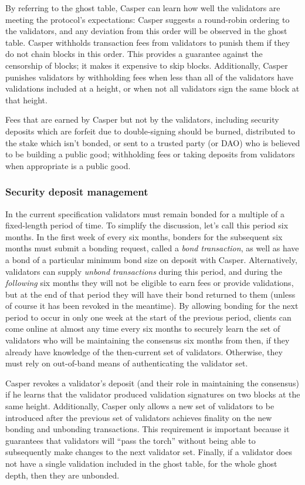 \documentclass[11pt,a4paper]{article}
\begin{document}
By referring to the ghost table, Casper can learn how well the validators are meeting the protocol's expectations: Casper suggests a round-robin ordering to the validators, and any deviation from this order will be observed in the ghost table. Casper withholds transaction fees from validators to punish them if they do not chain blocks in this order. This provides a guarantee against the censorship of blocks; it makes it expensive to skip blocks. Additionally, Casper punishes validators by withholding fees when less than all of the validators have validations included at a height, or when not all validators sign the same block at that height.

Fees that are earned by Casper but not by the validators, including security deposits which are forfeit due to double-signing should be burned, distributed to the stake which isn't bonded, or sent to a trusted party (or DAO) who is believed to be building a public good; withholding fees or taking deposits from validators when appropriate is a public good.


\subsubsection{Security deposit management}

In the current specification validators must remain bonded for a multiple of a fixed-length period of time. To simplify the discussion, let's call this period six months. In the first week of every six months, bonders for the subsequent six months must submit a bonding request, called a \emph{bond transaction}, as well as have a bond of a particular minimum bond size on deposit with Casper. Alternatively, validators can supply \emph{unbond transactions} during this period, and during the \emph{following} six months they will not be eligible to earn fees or provide validations, but at the end of that period they will have their bond returned to them (unless of course it has been revoked in the meantime). By allowing bonding for the next period to occur in only one week at the start of the previous period, clients can come online at almost any time every six months to securely learn the set of validators who will be maintaining the consensus six months from then, if they already have knowledge of the then-current set of validators. Otherwise, they must rely on out-of-band means of authenticating the validator set. 

Casper revokes a validator's deposit (and their role in maintaining the consensus) if he learns that the validator produced validation signatures on two blocks at the same height. Additionally, Casper only allows a new set of validators to be introduced after the previous set of validators achieves finality on the new bonding and unbonding transactions. This requirement is important because it guarantees that validators will ``pass the torch'' without being able to subsequently make changes to the next validator set. Finally, if a validator does not have a single validation included in the ghost table, for the whole ghost depth, then they are unbonded.
\end{document}
